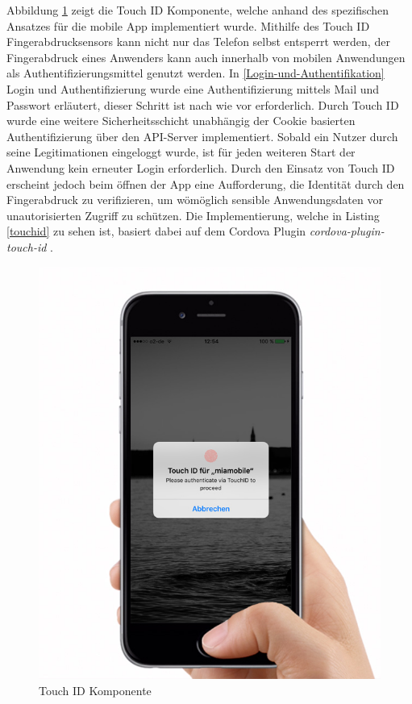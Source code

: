 Abbildung \ref{touchidmock} zeigt die Touch ID Komponente, welche anhand des spezifischen Ansatzes für die mobile App implementiert wurde.
Mithilfe des Touch ID Fingerabdrucksensors kann nicht nur das Telefon selbst entsperrt werden,
der Fingerabdruck eines Anwenders kann auch innerhalb von mobilen Anwendungen als Authentifizierungsmittel genutzt werden.
In \ref{Login-und-Authentifikation} Login und Authentifizierung wurde eine Authentifizierung mittels Mail und Passwort erläutert,
dieser Schritt ist nach wie vor erforderlich. Durch Touch ID wurde eine weitere Sicherheitsschicht unabhängig der Cookie basierten Authentifizierung über den API-Server implementiert.
Sobald ein Nutzer durch seine Legitimationen eingeloggt wurde, ist für jeden weiteren Start der Anwendung kein erneuter Login erforderlich.
Durch den Einsatz von Touch ID erscheint jedoch beim öffnen der App eine Aufforderung, die Identität durch den Fingerabdruck zu verifizieren, um wömöglich sensible Anwendungsdaten vor unautorisierten Zugriff zu schützen.
Die Implementierung, welche in Listing \ref{touchid} zu sehen ist, basiert dabei auf dem Cordova Plugin \emph{cordova-plugin-touch-id} \cite{EddyV87:online}.

\vspace{0.3cm}
\begin{figure}[h!]
 \centering
 \includegraphics[width=0.5\linewidth]{kapitel4/touchid-mock.jpg}
 \caption{Touch ID Komponente}
 \label{touchidmock}
\end{figure}

